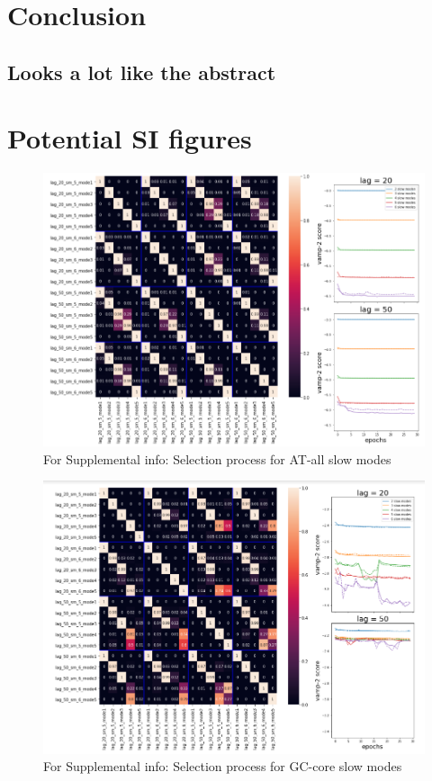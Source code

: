 \documentclass[journal=jpcbfk,manuscript=article]{achemso}
\begin{document}
\section{\label{sec:conc}Conclusion}
\subsection{\label{sec:Results}Looks a lot like the abstract}
    
    
\section{\label{sec:SI}Potential SI figures}
\begin{figure}[ht!]
	\begin{center}
        \includegraphics[width=\textwidth]{Figs/skeleton/AT-all_validation.PNG}
        \caption{For Supplemental info: Selection process for AT-all slow modes}
        \label{fig:AT-all_val}
	\end{center}
\end{figure}

\begin{figure}[ht!]
	\begin{center}
        \includegraphics[width=\textwidth]{Figs/skeleton/GC-core_validation.PNG}
        \caption{For Supplemental info: Selection process for GC-core slow modes}
        \label{fig:GC-core_val}
	\end{center}
\end{figure}
\end{document}
